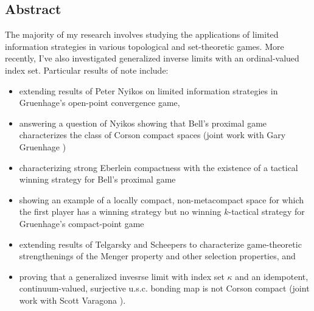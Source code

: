 \documentclass[11pt]{amsart}
\theoremstyle{plain}
\newcommand{\<}{\langle}
\renewcommand{\>}{\rangle}
\newcommand{\term}{\textit}
\begin{document}
\subsection*{Abstract}

The majority of my research involves studying the applications of
limited information strategies in various topological and set-theoretic
games. More recently,
I've also investigated generalized inverse limits with an ordinal-valued
index set. Particular results of note include:
  \begin{itemize}
    \item extending results of Peter Nyikos \cite{MR1031771} on limited
          information strategies in Gruenhage's open-point convergence game,
    \item answering a question of Nyikos \cite{MR3288115} showing
          that Bell's proximal game characterizes the class of Corson compact
          spaces (joint work with Gary Gruenhage \cite{MR3227201})
    \item characterizing strong Eberlein compactness with the existence of
          a tactical winning strategy for Bell's proximal game
          \cite{tacticProximal}
    \item showing an example of a locally compact, non-metacompact space for
          which the first player has a winning strategy but no winning
          $k$-tactical strategy for Gruenhage's compact-point game
          \cite{ktacticsCompactOpen}
    \item extending results of Telgarsky \cite{MR753073} and Scheepers
          \cite{MR1273523} to characterize
          game-theoretic strengthenings of the Menger property and other
          selection properties, and
    \item proving that a generalized invesrse limit with index set \(\kappa\)
          and an idempotent, continuum-valued, surjective u.s.c. bonding map
          is not Corson compact (joint work with Scott Varagona
          \cite{destroyMetrizability}).
  \end{itemize}


\end{document}
